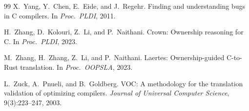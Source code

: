 \documentclass[11pt]{article}
\begin{document}
\begin{thebibliography}{99}
X.~Yang, Y.~Chen, E.~Eide, and J.~Regehr.
\newblock Finding and understanding bugs in C compilers.
\newblock In \emph{Proc.\ PLDI}, 2011.

H.~Zhang, D.~Kolouri, Z.~Li, and P.~Naithani.
\newblock Crown: Ownership reasoning for C.
\newblock In \emph{Proc.\ PLDI}, 2023.

M.~Zhang, H.~Zhang, Z.~Li, and P.~Naithani.
\newblock Laertes: Ownership-guided C-to-Rust translation.
\newblock In \emph{Proc.\ OOPSLA}, 2023.

L.~Zuck, A.~Pnueli, and B.~Goldberg.
\newblock VOC: A methodology for the translation validation of optimizing compilers.
\newblock \emph{Journal of Universal Computer Science}, 9(3):223--247, 2003.

\end{thebibliography}
\end{document}
